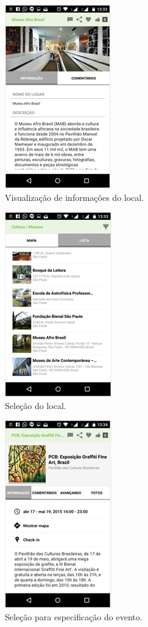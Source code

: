 \begin{figure}[H]
	 \centering
	\label{Visualização de informações do local}
	 \includegraphics[keepaspectratio=true,scale=0.8]{interacao/21.png}
	 \caption{Visualização de informações do local.}
\end{figure}
\begin{figure}[H]
	 \centering
	\label{Seleção do local}
	 \includegraphics[keepaspectratio=true,scale=0.8]{interacao/22.png}
	 \caption{Seleção do local.}
\end{figure}
\begin{figure}[H]
	 \centering
	\label{Seleção para especificação do evento}
	 \includegraphics[keepaspectratio=true,scale=0.8]{interacao/23.png}
	 \caption{Seleção para especificação do evento.}
\end{figure}

